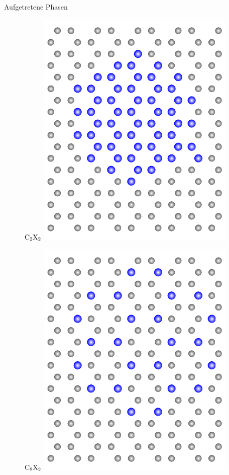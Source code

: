 \documentclass{beamer}
\begin{document}
	\begin{frame}{Aufgetretene Phasen}
		\begin{figure}
			\scriptsize
			\begin{minipage}[b]{0.32\textwidth}
				\centering
				$\rm C_2X_2$
				\includegraphics[width=0.85\textwidth, angle=90]{Abbildungen/C2X2.pdf}
			\end{minipage}
			\hfill
			\begin{minipage}[b]{0.32\textwidth}
				\centering
				$\rm C_8X_2$
				\includegraphics[width=0.85\textwidth, angle=90]{Abbildungen/Raumstrukturen/superzelle.pdf}

\end{minipage}
\end{figure}
\end{frame}
\end{document}
